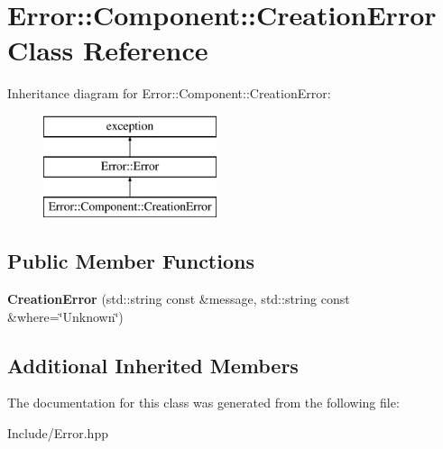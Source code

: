 \hypertarget{classError_1_1Component_1_1CreationError}{}\section{Error\+:\+:Component\+:\+:Creation\+Error Class Reference}
\label{classError_1_1Component_1_1CreationError}
Inheritance diagram for Error\+:\+:Component\+:\+:Creation\+Error\+:\begin{figure}[H]
\begin{center}
\leavevmode
\includegraphics[height=3.000000cm]{classError_1_1Component_1_1CreationError}
\end{center}
\end{figure}
\subsection*{Public Member Functions}
\begin{DoxyCompactItemize}
\item 
\mbox{\label{classError_1_1Component_1_1CreationError_ae30e73dab437659d6b2a27cb47efa130}} 
{\bfseries Creation\+Error} (std\+::string const \&message, std\+::string const \&where=\char`\"{}Unknown\char`\"{})
\end{DoxyCompactItemize}
\subsection*{Additional Inherited Members}


The documentation for this class was generated from the following file\+:\begin{DoxyCompactItemize}
\item 
Include/Error.\+hpp\end{DoxyCompactItemize}

